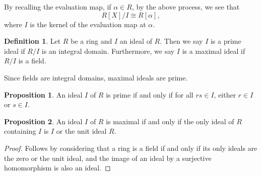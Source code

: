 \documentclass[]{article}
\theoremstyle{definition}
\theoremstyle{definition}
\newtheorem{definition}{Definition}[section]
\newtheorem{proposition}{Proposition}[section]
\begin{document}
By recalling the evaluation map, if \(\alpha \in R\), by the above process, we 
see that 
\[R[X] / I \cong R[\alpha],\]
where \(I\) is the kernel of the evaluation map at \(\alpha\).

\begin{definition}
  Let \(R\) be a ring and \(I\) an ideal of \(R\). Then we say \(I\) is a 
  prime ideal if \(R / I\) is an integral domain. Furthermore, we say 
  \(I\) is a maximal ideal if \(R / I\) is a field.
\end{definition}

Since fields are integral domains, maximal ideals are prime.

\begin{proposition}
  An ideal \(I\) of \(R\) is prime if and only if for all \(rs \in I\), either 
  \(r \in I\) or \(s \in I\).
\end{proposition}

\begin{proposition}
  An ideal \(I\) of \(R\) is maximal if and only if the only ideal of \(R\) 
  containing \(I\) is \(I\) or the unit ideal \(R\).
\end{proposition}
\begin{proof}
  Follows by considering that a ring is a field if and only if its only ideals 
  are the zero or the unit ideal, and the image of an ideal by a surjective 
  homomorphism is also an ideal.
\end{proof}
\end{document}
